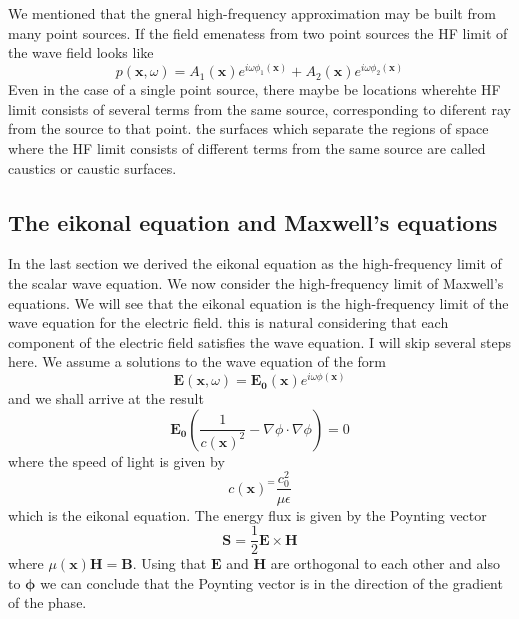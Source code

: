 \documentclass[../../main.tex]{subfiles} %
\begin{document}
We mentioned that the gneral high-frequency approximation may be built from many point sources. If the field emenatess from two point sources the HF limit of the wave field looks like
\begin{equation}
    p(\mathbf{x},\omega)=A_1(\mathbf{x})e^{i\omega \phi_1(\mathbf{x})}+A_2(\mathbf{x})e^{i\omega \phi_2(\mathbf{x})}
\end{equation}
Even in the case of a single point source, there maybe be locations wherehte HF limit consists of several terms from the same source, corresponding to diferent ray from the source to that point. the surfaces which separate the regions of space where the HF limit consists of different terms from the same source are called caustics or caustic surfaces.

\subsection{The eikonal equation and Maxwell's equations}
In the last section we derived the eikonal equation as the high-frequency limit of the scalar wave equation. We now consider the high-frequency limit of Maxwell's equations. We will see that the eikonal equation is the high-frequency limit of the wave equation for the electric field. this is natural considering that each component of the electric field satisfies the wave equation. I will skip several steps here. We assume a solutions to the wave equation of the form
\begin{equation}
    \mathbf{E}(\mathbf{x},\omega)=\mathbf{E_0}(\mathbf{x})e^{i\omega\phi(\mathbf{x})}
\end{equation}
and we shall arrive at the result 
\begin{equation}
    \mathbf{E_0}\left( \frac{1}{c(\mathbf{x})^2} -\nabla\phi\cdot\nabla\phi\right)=0
\end{equation}
where the speed of light is given by
\begin{equation}
    c(\mathbf{x})^=\frac{c_0^2}{\mu\epsilon}
\end{equation}
which is the eikonal equation. The energy flux is given by the Poynting vector
\begin{equation}
    \mathbf{S}=\frac{1}{2}\mathbf{E}\times\mathbf{H}
\end{equation}
where $\mu(\mathbf{x})\mathbf{H}=\mathbf{B}$. Using that $\mathbf{E}$ and $\mathbf{H}$ are orthogonal to each other and also to $\mathbf{\phi}$ we can conclude that the Poynting vector is in the direction of the gradient of the phase.
\end{document}
